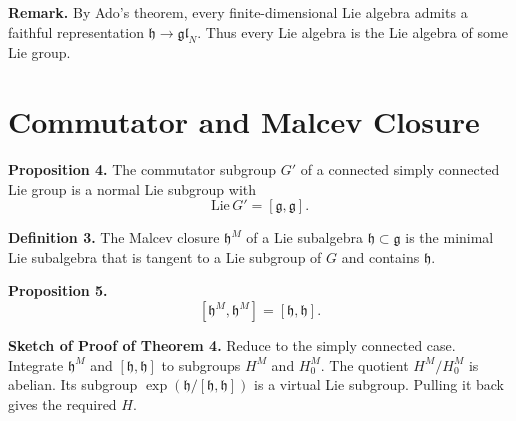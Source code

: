 \textbf{Remark.}
By Ado's theorem,
every finite-dimensional Lie algebra admits a faithful representation
$\mathfrak h \to \mathfrak{gl}_N$.
Thus every Lie algebra is the Lie algebra of some Lie group.

\section*{Commutator and Malcev Closure}

\textbf{Proposition 4.}
The commutator subgroup $G'$ of a connected simply connected Lie group
is a normal Lie subgroup with
\[
\mathrm{Lie}\,G'=[\mathfrak g,\mathfrak g].
\]

\textbf{Definition 3.}
The Malcev closure $\mathfrak h^M$ of a Lie subalgebra
$\mathfrak h\subset\mathfrak g$
is the minimal Lie subalgebra that is tangent
to a Lie subgroup of $G$ and contains $\mathfrak h$.

\textbf{Proposition 5.}
\[
[\mathfrak h^M,\mathfrak h^M]=[\mathfrak h,\mathfrak h].
\]

\textbf{Sketch of Proof of Theorem 4.}
Reduce to the simply connected case.
Integrate $\mathfrak h^M$ and $[\mathfrak h,\mathfrak h]$
to subgroups $H^M$ and $H_0^M$.
The quotient $H^M/H_0^M$ is abelian.
Its subgroup $\exp(\mathfrak h/[\mathfrak h,\mathfrak h])$
is a virtual Lie subgroup.
Pulling it back gives the required $H$.
